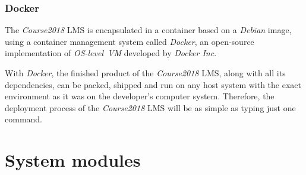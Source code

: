 \subsubsection{Docker}
The \emph{Course2018} LMS is encapsulated in a container based on a
\emph{Debian} image, using a container management system called \emph{Docker},
an open-source implementation of \emph{OS-level~VM} developed by
\emph{Docker Inc}.

\medskip

With \emph{Docker}, the finished product of the
\emph{Course2018} LMS, along with all its dependencies, can be packed, shipped
and run on any host system with the exact environment as it was on the
developer's computer system. Therefore, the deployment process of the
\emph{Course2018} LMS will be as simple as typing just one command.



\section{System modules}